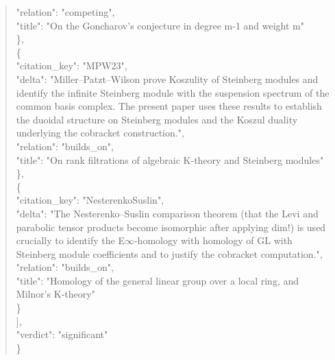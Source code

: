 \documentclass[11pt]{article}
\begin{document}
\begin{quote}
      "relation": "competing",\\
      "title": "On the Goncharov's conjecture in degree m-1 and weight m"\\
    \},\\
    \{\\
      "citation\_key": "MPW23",\\
      "delta": "Miller--Patzt--Wilson prove Koszulity of Steinberg modules and identify the infinite Steinberg module with the suspension spectrum of the common basis complex. The present paper uses these results to establish the duoidal structure on Steinberg modules and the Koszul duality underlying the cobracket construction.",\\
      "relation": "builds\_on",\\
      "title": "On rank filtrations of algebraic K-theory and Steinberg modules"\\
    \},\\
    \{\\
      "citation\_key": "NesterenkoSuslin",\\
      "delta": "The Nesterenko--Suslin comparison theorem (that the Levi and parabolic tensor products become isomorphic after applying dim!) is used crucially to identify the E\ensuremath{\infty}-homology with homology of GL with Steinberg module coefficients and to justify the cobracket computation.",\\
      "relation": "builds\_on",\\
      "title": "Homology of the general linear group over a local ring, and Milnor's K-theory"\\
    \}\\
  ],\\
  "verdict": "significant"\\
\}\\
\end{quote}
\end{document}
